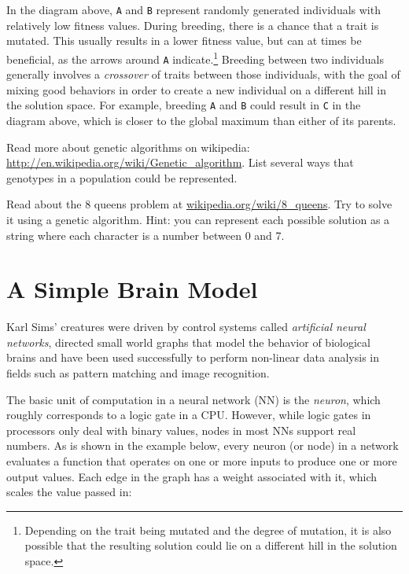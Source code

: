 In the diagram above, {\tt A} and {\tt B} represent randomly generated
individuals with relatively low fitness values. During breeding, there is a
chance that a trait is mutated. This usually results in a lower fitness value,
but can at times be beneficial, as the arrows around {\tt A}
indicate.\footnote{Depending on the trait being mutated and the degree of
mutation, it is also possible that the resulting solution could lie on a
different hill in the solution space.} Breeding between two individuals
generally involves a {\em crossover} of traits between those individuals, 
with the goal of mixing good behaviors in order to create a new individual 
on a different hill in the solution space. For example, breeding {\tt A} 
and {\tt B} could result in {\tt C} in the diagram above, which is closer 
to the global maximum than either of its parents.
 
\begin{ex}
  Read more about genetic algorithms on wikipedia: 
  \url{http://en.wikipedia.org/wiki/Genetic_algorithm}. List several ways that 
  genotypes in a population could be represented.
\end{ex}

\begin{ex}
  Read about the 8 queens problem at \url{wikipedia.org/wiki/8_queens}.
  Try to solve it using a genetic algorithm. Hint: you can represent
  each possible solution as a string where each character is a number
  between 0 and 7.
\end{ex}

\section{A Simple Brain Model}

Karl Sims' creatures were driven by control systems called {\em artificial neural
networks}, directed small world graphs that model the behavior of biological brains and
have been used successfully to perform non-linear data analysis in fields such as
pattern matching and image recognition.

The basic unit of computation in a neural network (NN) is the {\em neuron}, which
roughly corresponds to a logic gate in a CPU. However, while logic gates in 
processors only deal with binary values, nodes in most NNs support real numbers.
As is shown in the example below, every neuron (or node) in a network evaluates a 
function that operates on one or more inputs to produce one or more output values. 
Each edge in the graph has a weight associated with it, which scales the value passed in:

